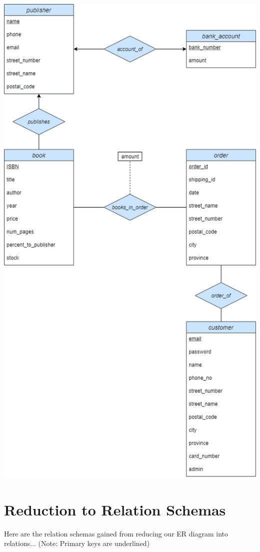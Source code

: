 \documentclass[a4 paper]{article}
\begin{document}
\includegraphics[scale=0.5]{../Diagrams/ER-diagram-bookstore-comp3005-finalproject.drawio.png}\\

\section{Reduction to Relation Schemas}
Here are the relation schemas gained from reducing our ER diagram into relations... (Note: Primary keys are underlined)\\
\end{document}
